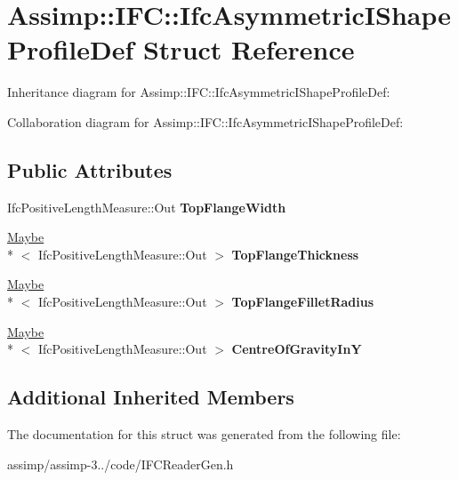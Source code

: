 \hypertarget{struct_assimp_1_1_i_f_c_1_1_ifc_asymmetric_i_shape_profile_def}{\section{Assimp\+:\+:I\+F\+C\+:\+:Ifc\+Asymmetric\+I\+Shape\+Profile\+Def Struct Reference}
\label{struct_assimp_1_1_i_f_c_1_1_ifc_asymmetric_i_shape_profile_def}
}


Inheritance diagram for Assimp\+:\+:I\+F\+C\+:\+:Ifc\+Asymmetric\+I\+Shape\+Profile\+Def\+:


Collaboration diagram for Assimp\+:\+:I\+F\+C\+:\+:Ifc\+Asymmetric\+I\+Shape\+Profile\+Def\+:
\subsection*{Public Attributes}
\begin{DoxyCompactItemize}
\item 
\hypertarget{struct_assimp_1_1_i_f_c_1_1_ifc_asymmetric_i_shape_profile_def_a37e94d6341e40eeac7f4362a3e76e40c}{Ifc\+Positive\+Length\+Measure\+::\+Out {\bfseries Top\+Flange\+Width}}\label{struct_assimp_1_1_i_f_c_1_1_ifc_asymmetric_i_shape_profile_def_a37e94d6341e40eeac7f4362a3e76e40c}

\item 
\hypertarget{struct_assimp_1_1_i_f_c_1_1_ifc_asymmetric_i_shape_profile_def_a4d362f04186d2e9241945aa9e357b463}{\hyperlink{struct_assimp_1_1_s_t_e_p_1_1_maybe}{Maybe}\\*
$<$ Ifc\+Positive\+Length\+Measure\+::\+Out $>$ {\bfseries Top\+Flange\+Thickness}}\label{struct_assimp_1_1_i_f_c_1_1_ifc_asymmetric_i_shape_profile_def_a4d362f04186d2e9241945aa9e357b463}

\item 
\hypertarget{struct_assimp_1_1_i_f_c_1_1_ifc_asymmetric_i_shape_profile_def_a6155a427a8172f88733012fd65f17b93}{\hyperlink{struct_assimp_1_1_s_t_e_p_1_1_maybe}{Maybe}\\*
$<$ Ifc\+Positive\+Length\+Measure\+::\+Out $>$ {\bfseries Top\+Flange\+Fillet\+Radius}}\label{struct_assimp_1_1_i_f_c_1_1_ifc_asymmetric_i_shape_profile_def_a6155a427a8172f88733012fd65f17b93}

\item 
\hypertarget{struct_assimp_1_1_i_f_c_1_1_ifc_asymmetric_i_shape_profile_def_ae0becbd496eff1df1f352a9f0f87d747}{\hyperlink{struct_assimp_1_1_s_t_e_p_1_1_maybe}{Maybe}\\*
$<$ Ifc\+Positive\+Length\+Measure\+::\+Out $>$ {\bfseries Centre\+Of\+Gravity\+In\+Y}}\label{struct_assimp_1_1_i_f_c_1_1_ifc_asymmetric_i_shape_profile_def_ae0becbd496eff1df1f352a9f0f87d747}

\end{DoxyCompactItemize}
\subsection*{Additional Inherited Members}


The documentation for this struct was generated from the following file\+:\begin{DoxyCompactItemize}
\item 
assimp/assimp-\/3../code/I\+F\+C\+Reader\+Gen.\+h\end{DoxyCompactItemize}
